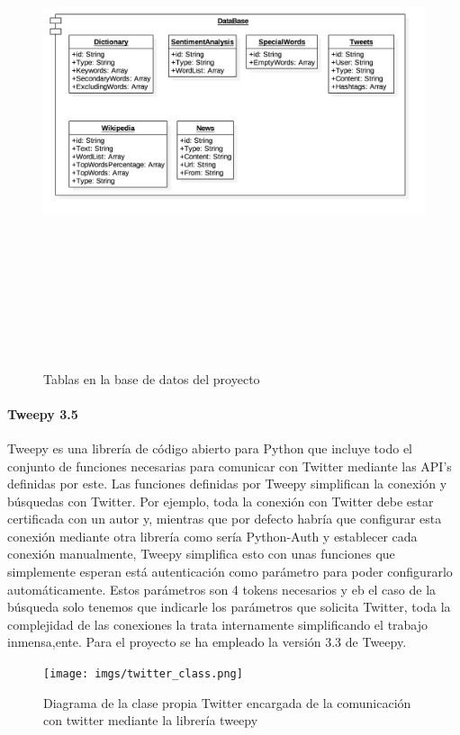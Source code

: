 \documentclass[../all.tex]{subfiles}
\begin{document}
        \begin{figure}[H]
        \centering
            \includegraphics[height=15cm, width=15cm]{imgs/DB.png}
            \caption{Tablas en la base de datos del proyecto}
        \end{figure}
    
        \paragraph{Tweepy 3.5}
            Tweepy es una librería de código abierto para Python que incluye todo el conjunto de funciones necesarias para comunicar con Twitter mediante las API's definidas por este. Las funciones definidas por Tweepy simplifican la conexión y búsquedas con Twitter. Por ejemplo, toda la conexión con Twitter debe estar certificada con un autor y, mientras que por defecto habría que configurar esta conexión mediante otra librería como sería Python-Auth y establecer cada conexión manualmente, Tweepy simplifica esto con unas funciones que simplemente esperan está autenticación como parámetro para poder configurarlo automáticamente. Estos parámetros son 4 tokens necesarios y eb el caso de la búsqueda solo tenemos que indicarle los parámetros que solicita Twitter, toda la complejidad de las conexiones la trata internamente simplificando el trabajo inmensa,ente. Para el proyecto se ha empleado la versión 3.3 de Tweepy.
            \begin{figure}[H]
            	\centering
            	\texttt{[image: imgs/twitter\_class.png]}
            	\caption{Diagrama de la clase propia Twitter encargada de la comunicación con twitter mediante la librería tweepy}
            \end{figure}
\end{document}
